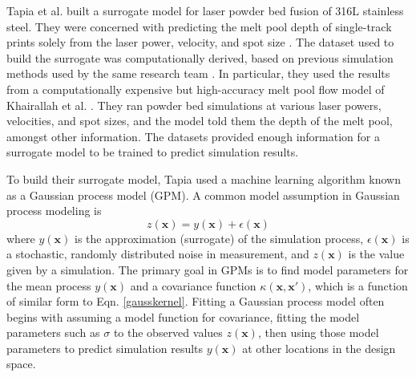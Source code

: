 Tapia et al. built a surrogate model for laser powder bed fusion of 316L stainless steel. They were concerned with predicting the melt pool depth of single-track prints solely from the laser power, velocity, and spot size \cite{Tapia2017}. The dataset used to build the surrogate was computationally derived, based on previous simulation methods used by the same research team \cite{King2014}. In particular, they used the results from a computationally expensive but high-accuracy melt pool flow model of Khairallah et al. \cite{Khairallah2016}. They ran powder bed simulations at various laser powers, velocities, and spot sizes, and the model told them the depth of the melt pool, amongst other information. The datasets provided enough information for a surrogate model to be trained to predict simulation results.


To build their surrogate model, Tapia used a machine learning algorithm known as a Gaussian process model (GPM). A common model assumption in Gaussian process modeling is
\begin{equation}
	z(\mathbf{x}) = y(\mathbf{x}) + \epsilon(\mathbf{x})
	\label{model}
\end{equation}
where $y(\mathbf{x})$ is the approximation (surrogate) of the simulation process, $\epsilon(\mathbf{x})$ is a stochastic, randomly distributed noise in measurement, and $z(\mathbf{x})$ is the value given by a simulation. The primary goal in GPMs is to find model parameters for the mean process $y(\mathbf{x})$ and a covariance function $\kappa(\mathbf{x},\mathbf{x}')$, which is a function of similar form to Eqn. \ref{gausskernel}. Fitting a Gaussian process model often begins with assuming a model function for covariance, fitting the model parameters such as $\sigma$ to the observed values $z(\mathbf{x})$, then using those model parameters to predict simulation results $y(\mathbf{x})$ at other locations in the design space. 


